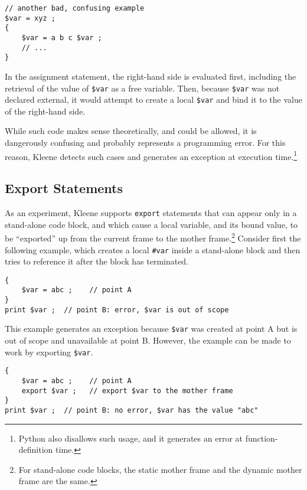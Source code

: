 \begin{samepage}
\begin{Verbatim}
// another bad, confusing example
$var = xyz ;
{
    $var = a b c $var ;  
    // ...
}
\end{Verbatim}
\end{samepage}

\noindent
In the assignment statement, the right-hand side is evaluated first, including the
retrieval of the value of \verb!$var! as a free variable.  Then, because \verb!$var! was
not declared external, it would attempt to create a local \verb!$var! and bind it to the
value of the right-hand side.


While such code makes sense theoretically, and could be allowed,
it is dangerously confusing and probably represents a programming error.  For this
reason, Kleene detects such cases and generates an exception at execution
time.\footnote{Python also disallows such usage, and it generates an error at
function-definition time.}


\subsection{Export Statements}

As an experiment, Kleene supports \texttt{export} statements that can
appear only in a stand-alone code block, and which cause a local
variable, and its bound value, to be ``exported'' up from the current
frame to the mother frame.\footnote{For stand-alone code blocks, the
static mother frame and the dynamic mother frame are the same.} Consider
first the following example, which creates a local \verb!#var! inside a
stand-alone block and then tries to reference it after the block has
terminated.

\begin{samepage}
\begin{Verbatim}
{
    $var = abc ;	// point A
}
print $var ;  // point B: error, $var is out of scope
\end{Verbatim}
\end{samepage}

\noindent
This example generates an exception because \verb!$var! was created at point
A but is out of scope and unavailable at point B.  However, the example can be made to work by exporting \verb!$var!.

\begin{samepage}
\begin{Verbatim}
{
    $var = abc ;	// point A
    export $var ;	// export $var to the mother frame
}
print $var ;  // point B: no error, $var has the value "abc"
\end{Verbatim}
\end{samepage}

